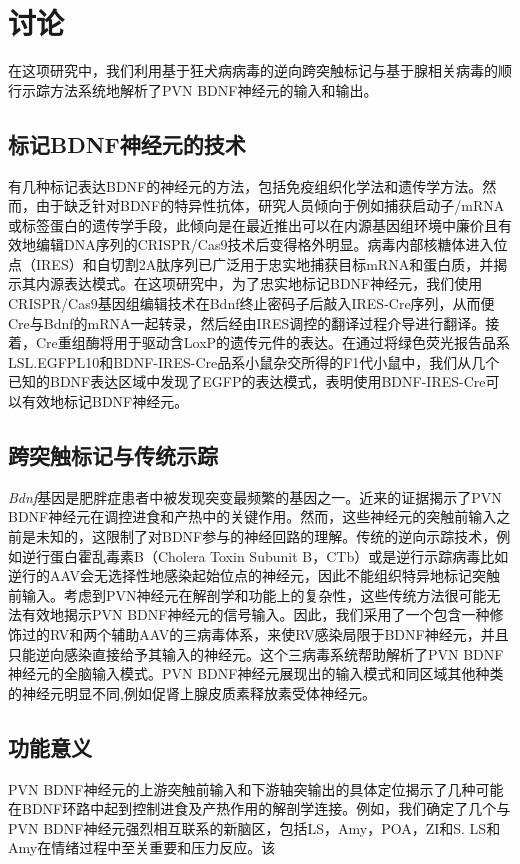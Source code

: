 \chapter{讨论}\label{chap:discussion}
在这项研究中，我们利用基于狂犬病病毒的逆向跨突触标记与基于腺相关病毒的顺行示踪方法系统地解析了PVN BDNF神经元的输入和输出。

\section{标记BDNF神经元的技术}
有几种标记表达BDNF的神经元的方法，包括免疫组织化学法和遗传学方法。然而，由于缺乏针对BDNF的特异性抗体，研究人员倾向于例如捕获启动子/mRNA或标签蛋白的遗传学手段，此倾向是在最近推出可以在内源基因组环境中廉价且有效地编辑DNA序列的CRISPR/Cas9技术后\citep{ran2013genome, doudna2014new}变得格外明显。病毒内部核糖体进入位点（IRES）和自切割2A肽序列已广泛用于忠实地捕获目标mRNA和蛋白质，并揭示其内源表达模式\citep{vong2011leptin, daigle2018suite}。在这项研究中，为了忠实地标记BDNF神经元，我们使用CRISPR/Cas9基因组编辑技术在Bdnf终止密码子后敲入IRES-Cre序列，从而便Cre与Bdnf的mRNA一起转录，然后经由IRES调控的翻译过程介导进行翻译。接着，Cre重组酶将用于驱动含LoxP的遗传元件的表达。在通过将绿色荧光报告品系LSL.EGFPL10和BDNF-IRES-Cre品系小鼠杂交所得的F1代小鼠中，我们从几个已知的BDNF表达区域中发现了EGFP的表达模式，表明使用BDNF-IRES-Cre可以有效地标记BDNF神经元。

\section{跨突触标记与传统示踪}
\textit{Bdnf}基因是肥胖症患者中被发现突变最频繁的基因之一。近来的证据揭示了PVN BDNF神经元在调控进食和产热中的关键作用。然而，这些神经元的突触前输入之前是未知的，这限制了对BDNF参与的神经回路的理解。传统的逆向示踪技术，例如逆行蛋白霍乱毒素B（Cholera Toxin Subunit B，CTb）\citep{conte2009multiple}或是逆行示踪病毒比如逆行的AAV\citep{tervo2016designer}会无选择性地感染起始位点的神经元，因此不能组织特异地标记突触前输入。考虑到PVN神经元在解剖学和功能上的复杂性，这些传统方法很可能无法有效地揭示PVN BDNF神经元的信号输入。因此，我们采用了一个包含一种修饰过的RV和两个辅助AAV的三病毒体系，来使RV感染局限于BDNF神经元，并且只能逆向感染直接给予其输入的神经元。这个三病毒系统帮助解析了PVN BDNF神经元的全脑输入模式。PVN BDNF神经元展现出的输入模式和同区域其他种类的神经元明显不同,例如促肾上腺皮质素释放素受体神经元\citep{jiang2018local}。

\section{功能意义}
PVN BDNF神经元的上游突触前输入和下游轴突输出的具体定位揭示了几种可能在BDNF环路中起到控制进食及产热作用的解剖学连接。例如，我们确定了几个与PVN BDNF神经元强烈相互联系的新脑区，包括LS，Amy，POA，ZI和S. LS和Amy在情绪过程中至关重要和压力反应\citep{yadin1993role,menard1996lateral}。该


